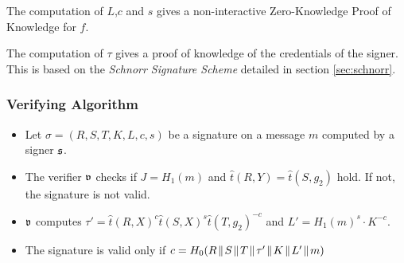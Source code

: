 The computation of $L$,$c$ and $s$ gives a non-interactive Zero-Knowledge Proof of Knowledge for $f$.

The computation of $\tau$ gives a proof of knowledge of the credentials of the signer. This is based on the \textit{Schnorr Signature Scheme} detailed in section \ref{sec:schnorr}.


\subsubsection*{Verifying Algorithm}
\begin{itemize}[align = left, leftmargin=*, label={--}]
\item Let $\sigma = (R,S,T,K,L,c,s)$ be a signature on a message $m$ computed by a signer ${\mathfrak s}$.

\item The verifier ${\mathfrak v}$ checks if $J = H_1(m)$ and $\hat{t}(R,Y) = \hat{t}(S,g_2)$ hold. If not, the signature is not valid.

\item ${\mathfrak v}$ computes $\tau ' =  \hat{t}(R,X)^c \hat{t}(S,X)^s \hat{t}(T,g_2)^{-c}$ and $L' = H_1(m)^s \cdot K^{-c}$.

\item The signature is valid only if $c = H_0(R \con S \con T \con \tau' \con K \con L' \con m)$

\end{itemize}



